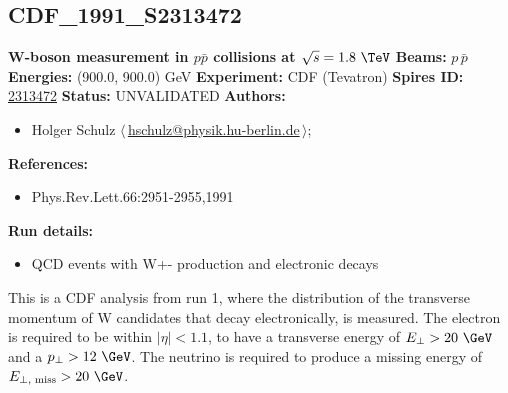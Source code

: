\subsection[CDF\_1991\_S2313472]{CDF\_1991\_S2313472\,\cite{Abe:1991rk}}
\textbf{W-boson \pT measurement in $p\bar{p}$ collisions at $\sqrt{s}=1.8~\TeV$}\newline
\textbf{Beams:} $p$\,$\bar{p}$ \newline
\textbf{Energies:} (900.0, 900.0) GeV \newline
\textbf{Experiment:} CDF (Tevatron) \newline
\textbf{Spires ID:} \href{http://www.slac.stanford.edu/spires/find/hep/www?rawcmd=key+2313472}{2313472}\newline
\textbf{Status:} UNVALIDATED\newline
\textbf{Authors:}
\begin{itemize}
  \item Holger Schulz $\langle\,$\href{mailto:hschulz@physik.hu-berlin.de}{hschulz@physik.hu-berlin.de}$\,\rangle$;
\end{itemize}
\textbf{References:}
\begin{itemize}
  \item Phys.Rev.Lett.66:2951-2955,1991
\end{itemize}
\textbf{Run details:}
\begin{itemize}

  \item QCD events with W+- production and electronic decays\end{itemize}

\noindent This is a CDF analysis from run 1, where the distribution of the transverse momentum of W candidates that decay  electronically, is measured. The electron is required to be within $\left|\eta\right| < 1.1$, to have a transverse energy of $E_\perp > 20~\GeV$ and a $p_\perp > 12~\GeV$. The neutrino is required to produce a missing energy of $E_{\perp, \text{ miss}}>20~\GeV$.

\clearpage


\clearpage

